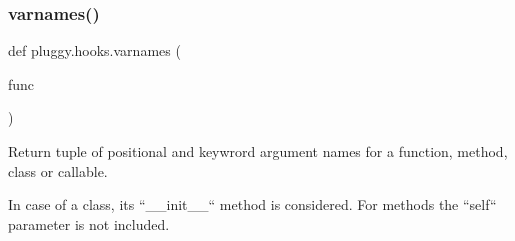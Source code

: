 \subsubsection{\texorpdfstring{varnames()}{varnames()}}
{\footnotesize\ttfamily def pluggy.\+hooks.\+varnames (\begin{DoxyParamCaption}\item[{}]{func }\end{DoxyParamCaption})}

\begin{DoxyVerb}Return tuple of positional and keywrord argument names for a function,
method, class or callable.

In case of a class, its ``__init__`` method is considered.
For methods the ``self`` parameter is not included.
\end{DoxyVerb}
 